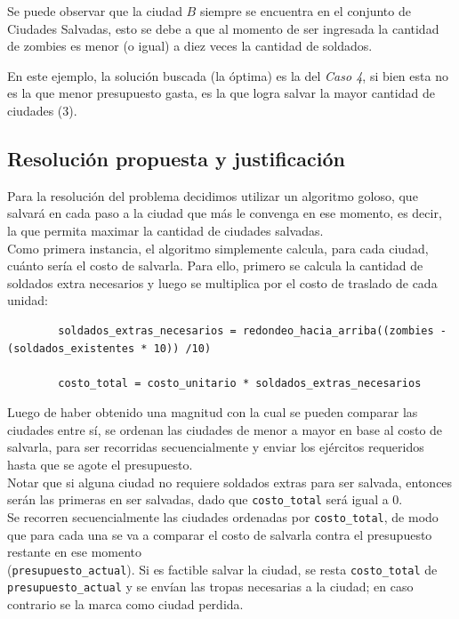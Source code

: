 Se puede observar que la ciudad $B$ siempre se encuentra en el conjunto de Ciudades Salvadas, esto se debe a que al momento de ser ingresada la cantidad de zombies es menor (o igual) a diez veces la cantidad de soldados. 

En este ejemplo, la soluci\'on buscada (la \'optima) es la del \emph{Caso 4}, si bien esta no es la que menor presupuesto gasta, es la que logra salvar la mayor cantidad de ciudades (3).

\newpage
\subsection{Resoluci\'on propuesta y justificaci\'on}

Para la resoluci\'on del problema decidimos utilizar un algoritmo goloso, que salvar\'a en cada paso a la ciudad que m\'as le convenga en ese momento, es decir, la que permita maximar la cantidad de ciudades salvadas.\\

Como primera instancia, el algoritmo simplemente calcula, para cada ciudad, cu\'anto ser\'ia el costo de salvarla. Para ello, primero se calcula la cantidad de soldados extra necesarios y luego se multiplica por el costo de traslado de cada unidad:\\


	\begin{codesnippet}
	\begin{verbatim}
		soldados_extras_necesarios = redondeo_hacia_arriba((zombies - (soldados_existentes * 10)) /10)
		
		costo_total = costo_unitario * soldados_extras_necesarios
	\end{verbatim}
	\end{codesnippet}

Luego de haber obtenido una magnitud con la cual se pueden comparar las ciudades entre s\'i, se ordenan las ciudades de menor a mayor en base al costo de salvarla, para ser recorridas secuencialmente y enviar los ej\'ercitos requeridos hasta que se agote el presupuesto.\\

Notar que si alguna ciudad no requiere soldados extras para ser salvada, entonces ser\'an las primeras en ser salvadas, dado que \texttt{costo_total} ser\'a igual a 0.\\
 
Se recorren secuencialmente las ciudades ordenadas por \texttt{costo_total}, de modo que para cada una se va a comparar el costo de salvarla contra el presupuesto restante en ese momento\\ (\texttt{presupuesto_actual}). Si es factible salvar la ciudad, se resta \texttt{costo_total} de \texttt{presupuesto_actual} y se env\'ian las tropas necesarias a la ciudad; en caso contrario se la marca como ciudad perdida.\\

